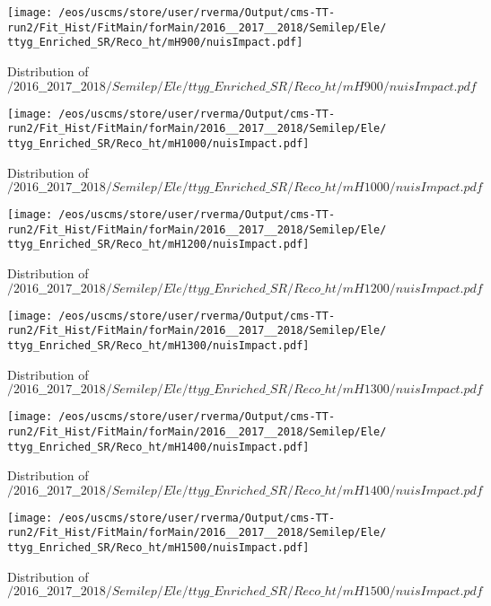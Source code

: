 \begin{figure}
\centering
\texttt{[image: /eos/uscms/store/user/rverma/Output/cms-TT-run2/Fit\_Hist/FitMain/forMain/2016\_\_2017\_\_2018/Semilep/Ele/ttyg\_Enriched\_SR/Reco\_ht/mH900/nuisImpact.pdf]}
\caption{Distribution of $/2016\_\_2017\_\_2018/Semilep/Ele/ttyg\_Enriched\_SR/Reco\_ht/mH900/nuisImpact.pdf$}
\end{figure}

\begin{figure}
\centering
\texttt{[image: /eos/uscms/store/user/rverma/Output/cms-TT-run2/Fit\_Hist/FitMain/forMain/2016\_\_2017\_\_2018/Semilep/Ele/ttyg\_Enriched\_SR/Reco\_ht/mH1000/nuisImpact.pdf]}
\caption{Distribution of $/2016\_\_2017\_\_2018/Semilep/Ele/ttyg\_Enriched\_SR/Reco\_ht/mH1000/nuisImpact.pdf$}
\end{figure}

\begin{figure}
\centering
\texttt{[image: /eos/uscms/store/user/rverma/Output/cms-TT-run2/Fit\_Hist/FitMain/forMain/2016\_\_2017\_\_2018/Semilep/Ele/ttyg\_Enriched\_SR/Reco\_ht/mH1200/nuisImpact.pdf]}
\caption{Distribution of $/2016\_\_2017\_\_2018/Semilep/Ele/ttyg\_Enriched\_SR/Reco\_ht/mH1200/nuisImpact.pdf$}
\end{figure}

\begin{figure}
\centering
\texttt{[image: /eos/uscms/store/user/rverma/Output/cms-TT-run2/Fit\_Hist/FitMain/forMain/2016\_\_2017\_\_2018/Semilep/Ele/ttyg\_Enriched\_SR/Reco\_ht/mH1300/nuisImpact.pdf]}
\caption{Distribution of $/2016\_\_2017\_\_2018/Semilep/Ele/ttyg\_Enriched\_SR/Reco\_ht/mH1300/nuisImpact.pdf$}
\end{figure}

\begin{figure}
\centering
\texttt{[image: /eos/uscms/store/user/rverma/Output/cms-TT-run2/Fit\_Hist/FitMain/forMain/2016\_\_2017\_\_2018/Semilep/Ele/ttyg\_Enriched\_SR/Reco\_ht/mH1400/nuisImpact.pdf]}
\caption{Distribution of $/2016\_\_2017\_\_2018/Semilep/Ele/ttyg\_Enriched\_SR/Reco\_ht/mH1400/nuisImpact.pdf$}
\end{figure}

\begin{figure}
\centering
\texttt{[image: /eos/uscms/store/user/rverma/Output/cms-TT-run2/Fit\_Hist/FitMain/forMain/2016\_\_2017\_\_2018/Semilep/Ele/ttyg\_Enriched\_SR/Reco\_ht/mH1500/nuisImpact.pdf]}
\caption{Distribution of $/2016\_\_2017\_\_2018/Semilep/Ele/ttyg\_Enriched\_SR/Reco\_ht/mH1500/nuisImpact.pdf$}
\end{figure}

